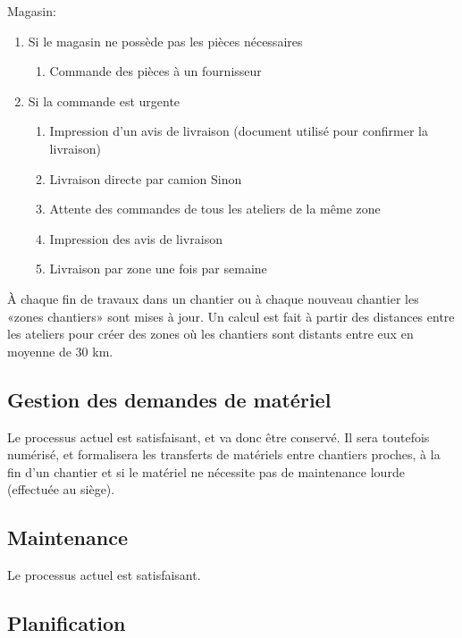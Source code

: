 \documentclass[twoside]{article}
\begin{document}
Magasin:
\begin{enumerate}
    \item Si le magasin ne possède pas les pièces nécessaires
    \begin{enumerate}
        \item Commande des pièces à un fournisseur
    \end{enumerate}

    \item Si la commande est urgente
    \begin{enumerate}
        \item Impression d'un avis de livraison
        (document utilisé pour confirmer la livraison)
        \item Livraison directe par camion
        Sinon
        \item Attente des commandes de tous les ateliers de la même zone
        \item Impression des avis de livraison
        \item Livraison par zone une fois par semaine
    \end{enumerate}
\end{enumerate}

À chaque fin de travaux dans un chantier ou à chaque nouveau chantier les
«zones chantiers» sont mises à jour. Un calcul est fait à partir des
distances entre les ateliers pour créer des zones où les chantiers sont
distants entre eux en moyenne de 30 km.


\subsection{Gestion des demandes de matériel}


Le processus actuel est satisfaisant, et va donc être conservé. Il sera
toutefois numérisé, et formalisera les transferts de matériels entre
chantiers proches, à la fin d'un chantier et si le matériel ne nécessite
pas de maintenance lourde (effectuée au siège).


\subsection{Maintenance}

Le processus actuel est satisfaisant.

\subsection{Planification}
\end{document}
